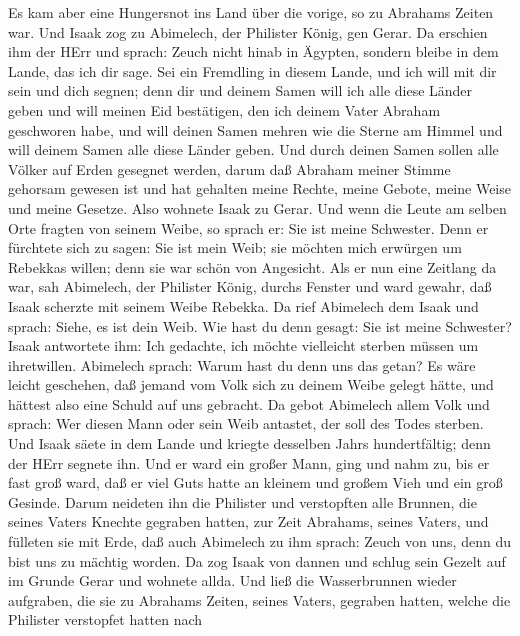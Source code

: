  Es kam aber eine Hungersnot ins Land über die vorige, so zu
Abrahams Zeiten war. Und Isaak zog zu Abimelech, der Philister König,
gen Gerar.  Da erschien ihm der HErr und sprach: Zeuch nicht
hinab in Ägypten, sondern bleibe in dem Lande, das ich dir sage.
 Sei ein Fremdling in diesem Lande, und ich will mit dir
sein und dich segnen; denn dir und deinem Samen will ich alle diese
Länder geben und will meinen Eid bestätigen, den ich deinem Vater
Abraham geschworen habe,  und will deinen Samen mehren wie
die Sterne am Himmel und will deinem Samen alle diese Länder geben. Und
durch deinen Samen sollen alle Völker auf Erden gesegnet werden,
 darum daß Abraham meiner Stimme gehorsam gewesen ist und
hat gehalten meine Rechte, meine Gebote, meine Weise und meine Gesetze.
 Also wohnete Isaak zu Gerar.  Und wenn die
Leute am selben Orte fragten von seinem Weibe, so sprach er: Sie ist
meine Schwester. Denn er fürchtete sich zu sagen: Sie ist mein Weib; sie
möchten mich erwürgen um Rebekkas willen; denn sie war schön von
Angesicht.  Als er nun eine Zeitlang da war, sah Abimelech,
der Philister König, durchs Fenster und ward gewahr, daß Isaak scherzte
mit seinem Weibe Rebekka.  Da rief Abimelech dem Isaak und
sprach: Siehe, es ist dein Weib. Wie hast du denn gesagt: Sie ist meine
Schwester? Isaak antwortete ihm: Ich gedachte, ich möchte vielleicht
sterben müssen um ihretwillen.  Abimelech sprach: Warum
hast du denn uns das getan? Es wäre leicht geschehen, daß jemand vom
Volk sich zu deinem Weibe gelegt hätte, und hättest also eine Schuld auf
uns gebracht.  Da gebot Abimelech allem Volk und sprach:
Wer diesen Mann oder sein Weib antastet, der soll des Todes sterben.
 Und Isaak säete in dem Lande und kriegte desselben Jahrs
hundertfältig; denn der HErr segnete ihn.  Und er ward ein
großer Mann, ging und nahm zu, bis er fast groß ward,  daß
er viel Guts hatte an kleinem und großem Vieh und ein groß Gesinde.
Darum neideten ihn die Philister  und verstopften alle
Brunnen, die seines Vaters Knechte gegraben hatten, zur Zeit Abrahams,
seines Vaters, und fülleten sie mit Erde,  daß auch
Abimelech zu ihm sprach: Zeuch von uns, denn du bist uns zu mächtig
worden.  Da zog Isaak von dannen und schlug sein Gezelt auf
im Grunde Gerar und wohnete allda.  Und ließ die
Wasserbrunnen wieder aufgraben, die sie zu Abrahams Zeiten, seines
Vaters, gegraben hatten, welche die Philister verstopfet hatten nach
